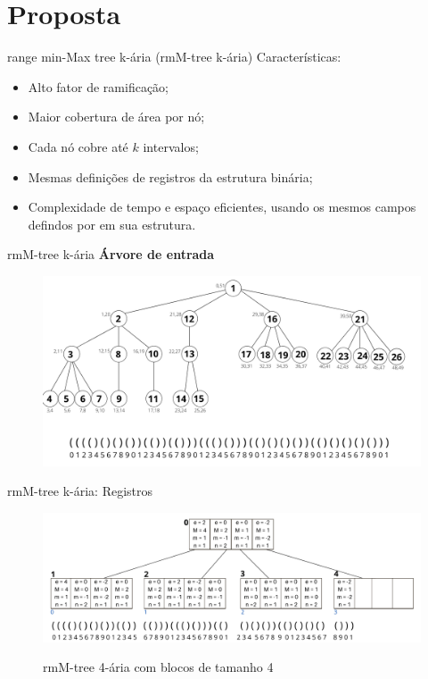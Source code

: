 \section{Proposta}

\begin{frame}{range min-Max tree k-ária (rmM-tree k-ária)}
    Características:
        \begin{itemize}
            \item Alto fator de ramificação;
            \item Maior cobertura de área por nó;
            \item Cada nó cobre até $k$ intervalos;
            \item Mesmas definições de registros da estrutura binária;
            \item Complexidade de tempo e espaço eficientes, usando os mesmos campos defindos por \cite{book-compact-data-structures} em sua estrutura.
        \end{itemize}
\end{frame}

\begin{frame}{rmM-tree k-ária}
    \textbf{Árvore de entrada}
        \begin{figure}[h!]
            \centering
            
            \includegraphics[scale=0.37]{images/arvore_geral.png}
        \end{figure} 
\end{frame}

\begin{frame}{rmM-tree k-ária: Registros}
    \begin{figure}[h!]
        \centering
        \includegraphics[scale=0.4]{images/rmm-tree-kary.png}\\
        \caption{rmM-tree 4-ária com blocos de tamanho 4}
    \end{figure} 
\end{frame}


